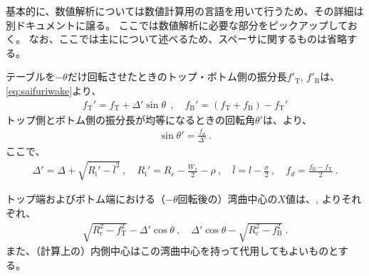 




基本的に、数値解析については数値計算用の言語を用いて行うため、その詳細は別ドキュメントに譲る。
ここでは数値解析に必要な部分をピックアップしておく。
なお、ここでは主に\DMname について述べるため、スペーサに関するものは省略する。


テーブルを$-\theta$だけ回転させたときのトップ・ボトム側の振分長$f'_\mathrm T$, $f'_\mathrm B$は、\eqref{eq:saifuriwake}より、
\begin{align*}
  f_\mathrm T' = f_\mathrm T+\varDelta'\!\sin\theta~~, \quad
  f_\mathrm B' = (f_\mathrm T+f_\mathrm B)-f_\mathrm T'
\end{align*}
トップ側とボトム側の振分長が均等になるときの回転角$\theta'$は、より、
\begin{align*}
  \sin\theta' = \frac{f_d}{\varDelta'}\ .
\end{align*}
ここで、
\begin{align*}
  \varDelta' = \varDelta+\sqrt{R_\mathrm i'-\bar l^2}\ , \quad
  R_\mathrm i' = R_\mathrm c-\frac{W_x}2-\rho\ ,\quad
  \bar l = l-\frac\sigma2\ ,\quad
  f_d = \frac{f_\mathrm B-f_\mathrm T}2\ .
\end{align*}



トップ端およびボトム端における（$-\theta$回転後の）湾曲中心の$X$値は、, よりそれぞれ、
\begin{align*}
  \sqrt{R_\mathrm c^2-f_\mathrm T^2}-\varDelta'\!\cos\theta~, \quad
  \varDelta'\!\cos\theta-\sqrt{R_\mathrm c^2-f_\mathrm B^2}~.
\end{align*}
また、（計算上の）内側中心はこの湾曲中心を持って代用してもよいものとする。


